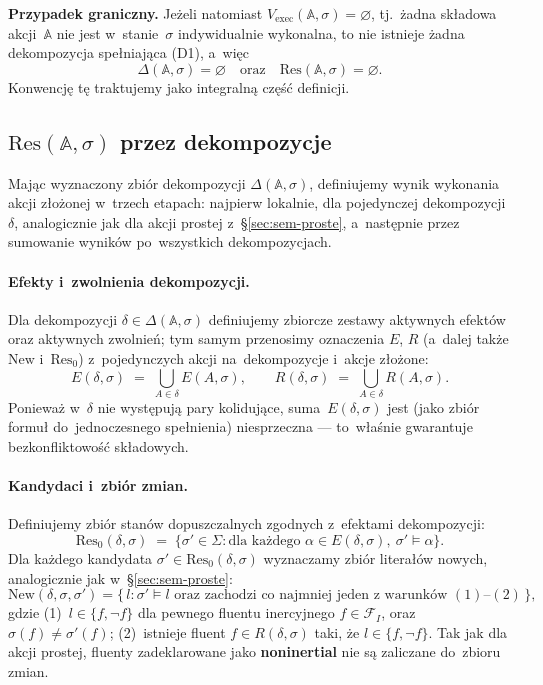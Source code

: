 \documentclass[11pt,a4paper]{article}
\newcommand{\noninertial}{\textbf{noninertial}}
\theoremstyle{definition}
\begin{document}
\medskip
\noindent \textbf{Przypadek graniczny.}
Jeżeli natomiast $V_{\mathrm{exec}}(\mathbb{A},\sigma) = \varnothing$,
tj.\ żadna składowa akcji~$\mathbb{A}$ nie jest w~stanie~$\sigma$
indywidualnie wykonalna, to nie istnieje żadna dekompozycja spełniająca
(D1), a~więc
\[
  \Delta(\mathbb{A},\sigma) = \varnothing
  \quad\text{oraz}\quad
  \mathrm{Res}(\mathbb{A},\sigma) = \varnothing.
\]
Konwencję tę traktujemy jako integralną część definicji.

\subsection{\texorpdfstring{$\mathrm{Res}(\mathbb{A}, \sigma)$}{Res(A,sigma)} przez dekompozycje}
\label{sec:res-zlozone}

Mając wyznaczony zbiór dekompozycji $\Delta(\mathbb{A},\sigma)$,
definiujemy wynik wykonania akcji złożonej w~trzech etapach: najpierw
lokalnie, dla pojedynczej dekompozycji $\delta$, analogicznie jak dla
akcji prostej z~\S\ref{sec:sem-proste}, a~następnie przez sumowanie wyników po~wszystkich
dekompozycjach.

\paragraph{Efekty i~zwolnienia dekompozycji.}
Dla dekompozycji $\delta \in \Delta(\mathbb{A},\sigma)$ definiujemy
zbiorcze zestawy aktywnych efektów oraz aktywnych zwolnień; tym samym przenosimy
oznaczenia $E$, $R$ (a~dalej także $\mathrm{New}$ i~$\mathrm{Res}_0$) z~pojedynczych
akcji na~dekompozycje i~akcje złożone:
\[
  E(\delta,\sigma) \;=\; \bigcup_{A \in \delta} E(A,\sigma),
  \qquad
  R(\delta,\sigma) \;=\; \bigcup_{A \in \delta} R(A,\sigma).
\]
Ponieważ w~$\delta$ nie występują pary kolidujące, suma~$E(\delta,\sigma)$
jest (jako zbiór formuł do~jednoczesnego spełnienia) niesprzeczna ---
to~właśnie gwarantuje bezkonfliktowość składowych.

\paragraph{Kandydaci i~zbiór zmian.}
Definiujemy zbiór stanów dopuszczalnych zgodnych z~efektami
dekompozycji:
\[
  \mathrm{Res}_0(\delta,\sigma)
    \;=\; \{\sigma' \in \Sigma :
      \text{dla każdego } \alpha \in E(\delta,\sigma),\ \sigma' \models \alpha\}.
\]
Dla każdego kandydata $\sigma' \in \mathrm{Res}_0(\delta,\sigma)$
wyznaczamy zbiór literałów nowych, analogicznie jak w~\S\ref{sec:sem-proste}:
\[
  \mathrm{New}(\delta,\sigma,\sigma')
    = \{\, l : \sigma' \models l \text{ oraz zachodzi co najmniej jeden
      z~warunków } (1)\text{--}(2)\,\},
\]
gdzie (1)~$l \in \{f, \neg f\}$ dla pewnego fluentu inercyjnego
$f \in \mathcal{F}_I$, oraz $\sigma(f)\neq\sigma'(f)$;
(2)~istnieje fluent $f \in R(\delta,\sigma)$ taki, że $l \in \{f, \neg f\}$.
Tak jak dla akcji prostej, fluenty zadeklarowane jako \noninertial{}
nie są zaliczane do~zbioru zmian.
\end{document}
